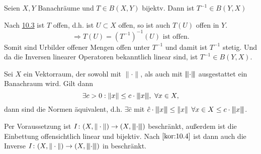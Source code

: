 \begin{kor} \label{kor:10.4}
	Seien $X, Y$ Banachräume und $T \in B(X, Y)$ bijektv. Dann ist $T^{-1} \in B(Y, X)$	
\end{kor}

\begin{beweis}
	Nach \hyperref[satz:10.3-offeneAbbildung]{10.3} ist $T$ offen, d.h. ist $U \subset X$ offen, so ist auch $T(U)$ offen in $Y$. \\
	\[ \Rightarrow T(U) = \left( T^{-1} \right)^{-1}(U) \text{ ist offen.} \]
	Somit sind Urbilder offener Mengen offen unter $T^{-1}$ und damit ist $T^{-1}$ stetig. Und da die Inversen linearer Operatoren bekanntlich linear sind, 	ist $T^{-1} \in B(Y, X)$.
\end{beweis}


\begin{kor} \label{kor:10.5}
	Sei $X$	ein Vektorraum, der sowohl mit $\| \cdot \|$, als auch mit ${\left\vert\kern-0.25ex\left\vert\kern-0.25ex\left\vert\cdot\right\vert\kern-0.25ex\right\vert\kern-0.25ex\right\vert}$ ausgestattet ein Banachraum wird. Gilt dann
		\[ \exists c > 0: \| x \| \leq c \cdot {\left\vert\kern-0.25ex\left\vert\kern-0.25ex\left\vert x\right\vert\kern-0.25ex\right\vert\kern-0.25ex\right\vert}, ~ \forall x \in X, \]
		dann sind die Normen äquivalent, d.h. $\exists \hat{c} $ mit $\hat{c} \cdot {\left\vert\kern-0.25ex\left\vert\kern-0.25ex\left\vert x\right\vert\kern-0.25ex\right\vert\kern-0.25ex\right\vert} \leq \| x \|$ $\forall x \in X \leq c \cdot {\left\vert\kern-0.25ex\left\vert\kern-0.25ex\left\vert x\right\vert\kern-0.25ex\right\vert\kern-0.25ex\right\vert}$. 
\end{kor}

\begin{beweis}
	Per Voraussetzung ist $I \colon (X, \| \cdot \|) \rightarrow (X, {\left\vert\kern-0.25ex\left\vert\kern-0.25ex\left\vert\cdot\right\vert\kern-0.25ex\right\vert\kern-0.25ex\right\vert})$ beschränkt, außerdem ist die Einbettung offensichtlich linear und bijektiv. Nach $\ref{kor:10.4}$ ist dann auch die Inverse $I \colon (X, \| \cdot \|) \rightarrow (X, {\left\vert\kern-0.25ex\left\vert\kern-0.25ex\left\vert\cdot\right\vert\kern-0.25ex\right\vert\kern-0.25ex\right\vert})$ in beschränkt.
\end{beweis}



\newpage